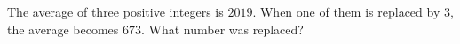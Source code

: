 The average of three positive integers is $2019$. When one of them is replaced by $3$, the average becomes $673$. What number was replaced?
